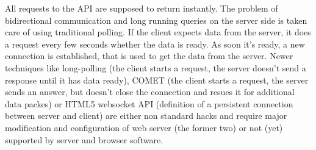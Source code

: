 

All requests to the API are supposed to return instantly.
The problem of bidirectional communication and long running queries on the server side is taken care of using traditional polling.
If the client expects data from the server, it does a request every few seconds whether the data is ready.
As soon it's ready, a new connection is established, that is used to get the data from the server.
Newer techniques like long-polling (the client starts a request, the server doesn't send a response until it has data ready), COMET (the client starts a request, the server sends an answer, but doesn't close the connection and resues it for additional data packes) or HTML5 websocket API (definition of a persistent connection between server and client) are either non standard hacks and require major modification and configuration of web server (the former two) or not (yet) supported by server and browser software.


